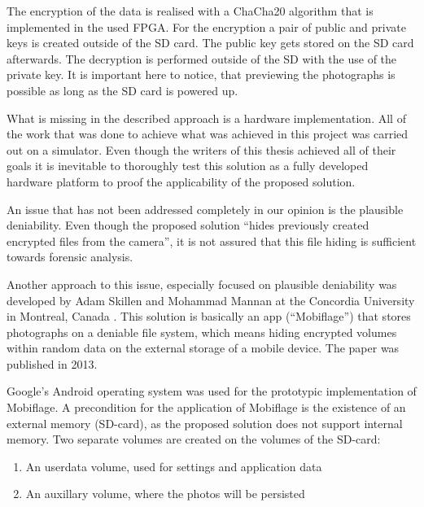 \documentclass[12pt,a4paper,titlepage,oneside]{scrartcl}
\begin{document}
The encryption of the data is realised with a ChaCha20 algorithm that is implemented in the used FPGA.
For the encryption a pair of public and private keys is created outside of the SD card.
The public key gets stored on the SD card afterwards.
The decryption is performed outside of the SD with the use of the private key.
It is important here to notice, that previewing the photographs is possible as long as the SD card is powered up. 

What is missing in the described approach is a hardware implementation.
All of the work that was done to achieve what was achieved in this project was carried out on a simulator.
Even though the writers of this thesis achieved all of their goals it is inevitable to thoroughly test this solution as a fully developed hardware platform to proof the applicability of the proposed solution.

An issue that has not been addressed completely in our opinion is the plausible deniability.
Even though the proposed solution ``hides previously created encrypted files from the camera'', it is not assured that this file hiding is sufficient towards forensic analysis.

Another approach to this issue, especially focused on plausible deniability was developed by Adam Skillen and Mohammad Mannan at the Concordia University in Montreal, Canada \cite{skillen2013implementing}.
This solution is basically an app (``Mobiflage'') that stores photographs on a deniable file system, which means hiding encrypted volumes within random data on the external storage of a mobile device.
The paper was published in 2013.

Google's Android operating system was used for the prototypic implementation of Mobiflage.
A precondition for the application of Mobiflage is the existence of an external memory (SD-card), as the proposed solution does not support internal memory.
Two separate volumes are created on the volumes of the SD-card:
\begin{enumerate}
  \item An userdata volume, used for settings and application data
  \item An auxillary volume, where the photos will be persisted
\end{enumerate}
\end{document}
